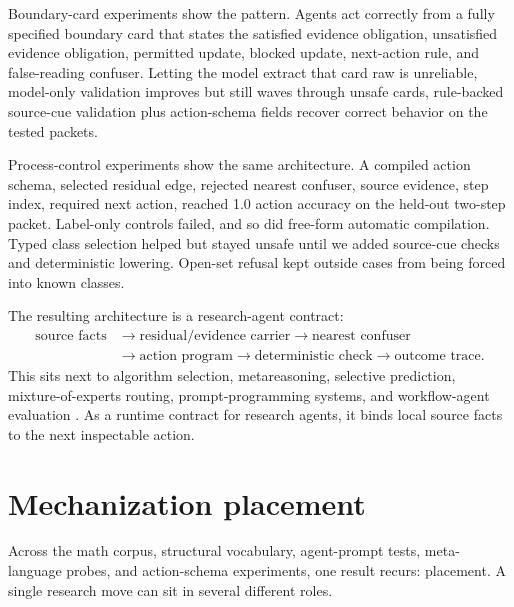\documentclass[11pt]{article}
\begin{document}
Boundary-card experiments show the pattern. Agents act correctly from a fully
specified boundary card that states the satisfied evidence obligation,
unsatisfied evidence obligation, permitted update, blocked update, next-action
rule, and false-reading confuser. Letting the model extract that card raw is
unreliable, model-only validation improves but still waves through unsafe cards,
rule-backed source-cue validation plus action-schema fields recover correct
behavior on the tested packets.

Process-control experiments show the same architecture. A compiled action
schema, selected residual edge, rejected nearest confuser, source evidence, step
index, required next action, reached 1.0 action accuracy on the held-out
two-step packet. Label-only controls failed, and so did free-form automatic
compilation. Typed class selection helped but stayed unsafe until we added
source-cue checks and deterministic lowering. Open-set refusal kept outside cases
from being forced into known classes.

The resulting architecture is a research-agent contract:
\[
\begin{aligned}
\text{source facts} &\rightarrow \text{residual/evidence carrier}
\rightarrow \text{nearest confuser} \\
&\rightarrow \text{action program}
\rightarrow \text{deterministic check}
\rightarrow \text{outcome trace}.
\end{aligned}
\]
This sits next to algorithm selection, metareasoning, selective prediction,
mixture-of-experts routing, prompt-programming systems, and workflow-agent
evaluation \citep{rice1976,xu2008satzilla,jacobs1991adaptive,russell1991rational,geifman2017selective,chen2023frugalgpt,ong2024routellm,hu2024routerbench,flowagent2025,sopbench2025,agentcompany2024}.
As a runtime contract for research agents, it binds local source facts to the
next inspectable action.

\section{Mechanization placement}

Across the math corpus, structural vocabulary, agent-prompt tests, meta-language
probes, and action-schema experiments, one result recurs: placement. A single
research move can sit in several different roles.
\end{document}

